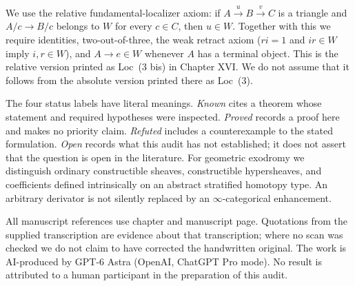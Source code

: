 We use the relative fundamental-localizer axiom: if
$A\xrightarrow{u}B\xrightarrow{v}C$ is a triangle and
$A/c\to B/c$ belongs to $W$ for every $c\in C$, then $u\in W$.
Together with this we require identities, two-out-of-three, the weak
retract axiom ($ri=1$ and $ir\in W$ imply $i,r\in W$), and
$A\to e\in W$ whenever $A$ has a terminal object. This is the relative
version printed as Loc~(3 bis) in Chapter XVI. We do not assume that it
follows from the absolute version printed there as Loc~(3).

The four status labels have literal meanings. \emph{Known} cites a theorem
whose statement and required hypotheses were inspected. \emph{Proved}
records a proof here and makes no priority claim. \emph{Refuted} includes a
counterexample to the stated formulation. \emph{Open} records what this
audit has not established; it does not assert that the question is open
in the literature. For geometric exodromy we distinguish ordinary
constructible sheaves, constructible hypersheaves, and coefficients defined
intrinsically on an abstract stratified homotopy type. An arbitrary
derivator is not silently replaced by an $\infty$-categorical enhancement.

All manuscript references use chapter and manuscript page. Quotations from
the supplied transcription are evidence about that transcription; where no
scan was checked we do not claim to have corrected the handwritten original.
The work is AI-produced by GPT-6 Astra (OpenAI, ChatGPT Pro mode). No result
is attributed to a human participant in the preparation of this audit.
